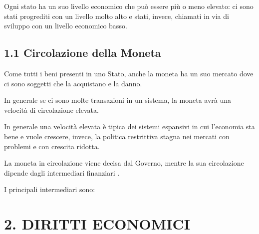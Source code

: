 \documentclass[letterpaper,10pt,italian]{sphinxmanual}
\begin{document}
\sphinxAtStartPar
Ogni stato ha un suo livello economico che può essere più o meno elevato:
ci sono stati progrediti con un livello molto alto e stati, invece, chiamati in via di
sviluppo con un livello economico basso.


\section{1.1 Circolazione della Moneta}
\label{\detokenize{1.La Moneta:circolazione-della-moneta}}
\sphinxAtStartPar
Come tutti i beni presenti in uno Stato, anche la moneta ha un suo mercato dove ci sono soggetti che la acquistano
e la danno.

\sphinxAtStartPar
In generale se ci sono molte transazioni in un sistema, la moneta avrà una velocità di circolazione elevata.

\sphinxAtStartPar
In generale una velocità elevata è tipica dei sistemi espansivi in cui l’economia sta bene e vuole crescere,
invece, la politica restrittiva stagna nei mercati con problemi e con crescita ridotta.

\sphinxAtStartPar
La moneta in circolazione viene decisa dal Governo, mentre la sua circolazione dipende dagli intermediari
finanziari .

\sphinxAtStartPar
I principali intermediari sono:

\sphinxAtStartPar
{}

\sphinxAtStartPar
{}

\sphinxAtStartPar
{}

\sphinxstepscope


\chapter{2. DIRITTI ECONOMICI}
\label{\detokenize{2.DIRITTI ECONOMICI-LAVORO:diritti-economici}}\label{\detokenize{2.DIRITTI ECONOMICI-LAVORO::doc}}
\end{document}
